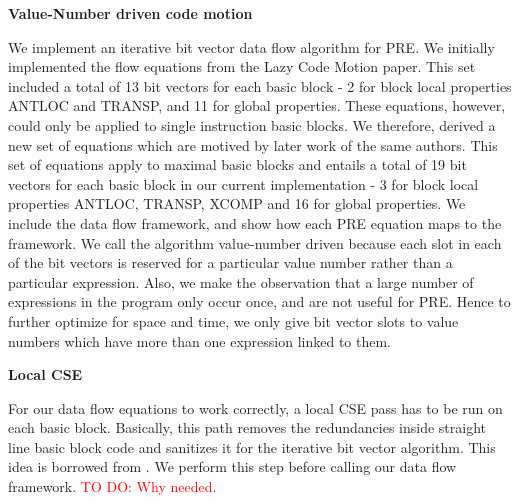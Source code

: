 \documentclass[10pt,twoside]{report}
\begin{document}
\begin{flushleft}
\textbf{\large{Value-Number driven code motion}}
\end{flushleft}
We implement an iterative bit vector data flow algorithm for PRE. We initially
implemented the flow equations from the Lazy Code Motion paper. This set
included a total of 13 bit vectors for each basic block - 2 for block local
properties ANTLOC and TRANSP, and 11 for global properties. These equations,
           however, could only be applied to single instruction basic blocks.
           We therefore, derived a new set of equations which are motived by
           later work\cite{Knoop:1994:OCM:183432.183443} of the same authors.
           This set of equations apply to maximal basic blocks and
           entails a total of 19 bit vectors for each basic block in our
           current implementation - 3 for block local properties ANTLOC,
           TRANSP, XCOMP and 16 for global properties.  We include the
           data flow framework, and show how each PRE equation maps to the
           framework. We call the algorithm value-number driven because each
           slot in each of the bit vectors is reserved for a particular value
           number rather than a particular expression. Also, we make the
           observation that a large number of expressions in the program only
           occur once, and are not useful for PRE. Hence to further optimize
           for space and time, we only give bit vector slots to value numbers
           which have more than one expression linked to them.

\begin{flushleft}
\textbf{\large{Local CSE}}
\end{flushleft}
For our data flow equations to work correctly, a local CSE pass has to be run
on each basic block. Basically, this path removes the redundancies inside
straight line basic block code and sanitizes it for the iterative bit vector
algorithm. This idea is borrowed from \cite{Knoop:1994:OCM:183432.183443}. We perform this step before calling
our data flow framework. 
\textcolor{red}{TO DO: Why needed.}
\end{document}
